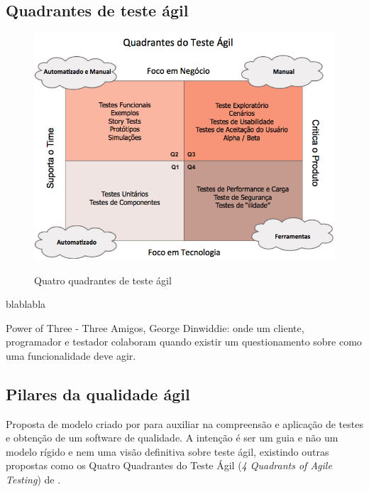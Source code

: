 \documentclass[
	12pt,				%
	openright,			%
	oneside,			%
	a4paper,			%
	english,			%
	brazil,				%
	]{abntex2}
\begin{document}
\subsection{Quadrantes de teste ágil}
\begin{figure}[H]
    \centering
    \caption{Quatro quadrantes de teste ágil}
    \graphicspath{ {./graphics/agile/} }
    \includegraphics[scale=0.6]{Quadrante-Teste-Agil}
    \label{fig:quatro-quadrantes}
\end{figure}

blablabla

Power of Three - Three Amigos, George Dinwiddie: onde um cliente, programador e testador colaboram quando existir um questionamento sobre como uma funcionalidade deve agir.

\subsection{Pilares da qualidade ágil}
Proposta de modelo criado por  para auxiliar na compreensão e aplicação de testes e obtenção de um software de qualidade. A intenção é ser um guia e não um modelo rígido e nem uma visão definitiva sobre teste ágil, existindo outras propostas como os Quatro Quadrantes do Teste Ágil (\emph{4 Quadrants of Agile Testing}) de .
\end{document}
